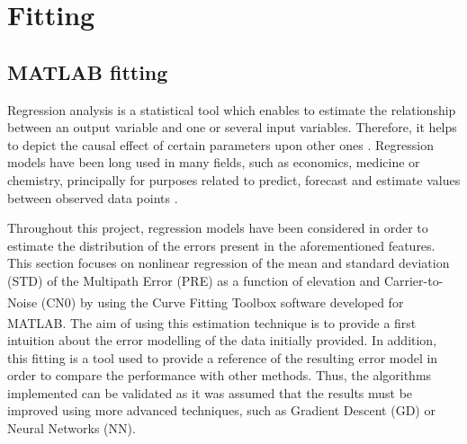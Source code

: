 \documentclass[a4paper, report, oneside, UKenglish]{memoir}
\begin{document}


%         



\chapter{Fitting}\label{ch:fitting}

\section{MATLAB fitting}

Regression analysis is a statistical tool which enables to estimate the relationship between an output variable and one or several input variables. Therefore, it helps to depict the causal effect of certain parameters upon other ones \cite{IntroToRegresAna}. Regression models have been long used in many fields, such as economics, medicine or chemistry, principally for purposes related to predict, forecast and estimate values between observed data points \cite{MathWorksRegression}.  

Throughout this project, regression models have been considered in order to estimate the distribution of the errors present in the aforementioned features. This section focuses on nonlinear regression of the mean and standard deviation (STD) of the Multipath Error (PRE) as a function of elevation and Carrier-to-Noise (CN0) by using the Curve Fitting Toolbox\textsuperscript{\tiny\texttrademark} software developed for MATLAB\textsuperscript{\tiny\textregistered}. The aim of using this estimation technique is to provide a first intuition about the error modelling of the data initially provided. In addition, this fitting is a tool used to provide a reference of the resulting error model in order to compare the performance with other methods. Thus, the algorithms implemented can be validated as it was assumed that the results must be improved using more advanced techniques, such as Gradient Descent (GD) or Neural Networks (NN). 
\end{document}

